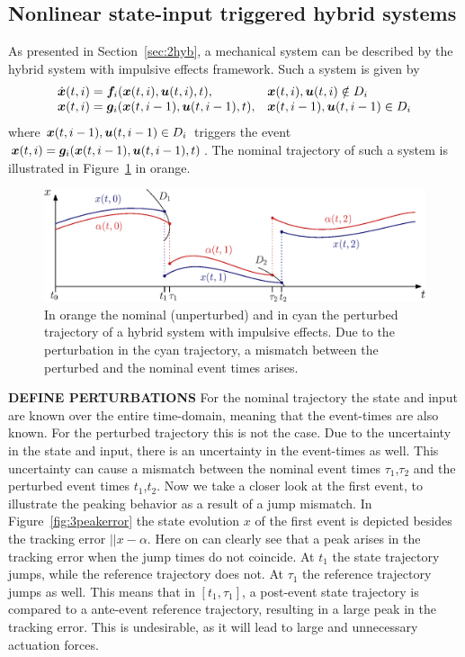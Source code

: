 \documentclass[../DC2017114Bouma.tex]{subfiles}
\begin{document}
\subsection{Nonlinear state-input triggered hybrid systems}
As presented in Section~\ref{sec:2hyb}, a mechanical system can be described by the hybrid system with impulsive effects framework. Such a system is given by
\begin{equation}
\begin{array}{ll}
\dot{{\boldsymbol{x}}}(t,i) ={\boldsymbol{f}}_i({\boldsymbol{x}}(t,i),{\boldsymbol{u}}(t,i),t),& {\boldsymbol{x}}(t,i),{\boldsymbol{u}}(t,i)\notin D_i\\
{\boldsymbol{x}}(t,i) = {\boldsymbol{g}}_i({\boldsymbol{x}}(t,i-1),{\boldsymbol{u}}(t,i-1),t),& {\boldsymbol{x}}(t,i-1),{\boldsymbol{u}}(t,i-1)\in D_i
\end{array}\label{eq:3hybimp}
\end{equation}
where ${\boldsymbol{x}}(t,i-1),{\boldsymbol{u}}(t,i-1)\in D_i$ triggers the event ${\boldsymbol{x}}(t,i) = {\boldsymbol{g}}_i({\boldsymbol{x}}(t,i-1),{\boldsymbol{u}}(t,i-1),t)$. The nominal trajectory of such a system is illustrated in Figure~\ref{fig:3perturbedtraj} in orange.
\begin{figure}[h]
\centering
\includegraphics[width=.8\textwidth]{perturbedtraj.eps}\caption{In orange the nominal (unperturbed) and in cyan the perturbed trajectory of a hybrid system with impulsive effects. Due to the perturbation in the cyan trajectory, a mismatch between the perturbed and the nominal event times arises.} \label{fig:3perturbedtraj}
\end{figure}
\textbf{DEFINE PERTURBATIONS} For the nominal trajectory the state and input are known over the entire time-domain, meaning that the event-times are also known. For the perturbed trajectory this is not the case. Due to the uncertainty in the state and input, there is an uncertainty in the event-times as well. This uncertainty can cause a mismatch between the nominal event times $\tau_1$,$\tau_2$ and the perturbed event times $t_1$,$t_2$. Now we take a closer look at the first event, to illustrate the peaking behavior as a result of a jump mismatch. In Figure~\ref{fig:3peakerror} the state evolution $x$ of the first event is depicted besides the tracking error $||x-\alpha$. Here on can clearly see that a peak arises in the tracking error when the jump times do not coincide. At $t_1$ the state trajectory jumps, while the reference trajectory does not. At $\tau_1$ the reference trajectory jumps as well. This means that in $[t_1,\tau_1]$, a post-event state trajectory is compared to a ante-event reference trajectory, resulting in a large peak in the tracking error. This is undesirable, as it will lead to large and unnecessary actuation forces.
\end{document}
